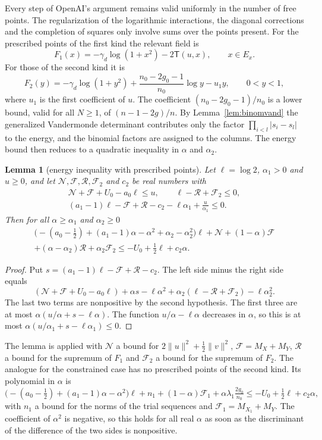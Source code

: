 \documentclass[11pt]{amsart}
\newtheorem{lemma}[theorem]{Lemma}
\theoremstyle{definition}
\theoremstyle{remark}
\numberwithin{equation}{section}
\begin{document}
Every step of OpenAI's argument remains valid uniformly in the number of free points. The regularization of
the logarithmic interactions, the diagonal corrections and the completion of squares only involve sums over
the points present. For the prescribed points of the first kind the relevant field is
\[
 F_1(x)=-\gamma_d\log(1+x^2)-2\mathsf T(u,x),\qquad x\in E_x .
\]
For those of the second kind it is
\[
 F_2(y)=-\gamma_d\log(1+y^2)+\frac{n_0-2g_0-1}{n_0}\log y-u_1y,\qquad0<y<1,
\]
where $u_1$ is the first coefficient of $u$. The coefficient $(n_0-2g_0-1)/n_0$ is a lower bound, valid for all
$N\ge1$, of $(n-1-2g)/n$. By Lemma~\ref{lem:binomvand} the generalized Vandermonde determinant contributes only
the factor $\prod_{i<l}|s_i-s_l|$ to the energy, and the binomial factors are assigned to the columns. The
energy bound then reduces to a quadratic inequality in $\alpha$ and $\alpha_2$.

\begin{lemma}[energy inequality with prescribed points]\label{lem:energy-ineq}
Let $\ell=\log2$, $\alpha_1>0$ and $u\ge0$, and let $\mathcal N,\mathcal F,\mathcal R,\mathcal F_2$ and $c_2$ be real
numbers with
\begin{gather*}
 \mathcal N+\mathcal F+U_0-a_0\ell\le u,\qquad \ell-\mathcal R+\mathcal F_2\le0,\\
 (a_1-1)\ell-\mathcal F+\mathcal R-c_2-\ell\alpha_1+\frac u{\alpha_1}\le0 .
\end{gather*}
Then for all $\alpha\ge\alpha_1$ and $\alpha_2\ge0$
\begin{multline*}
 \bigl(-(a_0-\tfrac12)+(a_1-1)\alpha-\alpha^2+\alpha_2-\alpha_2^2\bigr)\ell+\mathcal N+(1-\alpha)\mathcal F\\
 +(\alpha-\alpha_2)\mathcal R+\alpha_2\mathcal F_2\le-U_0+\tfrac12\ell+c_2\alpha .
\end{multline*}
\end{lemma}

\begin{proof}
Put $s=(a_1-1)\ell-\mathcal F+\mathcal R-c_2$. The left side minus the right side equals
\[
 (\mathcal N+\mathcal F+U_0-a_0\ell)+\alpha s-\ell\alpha^2+\alpha_2(\ell-\mathcal R+\mathcal F_2)-\ell\alpha_2^2 .
\]
The last two terms are nonpositive by the second hypothesis. The first three are at most
$\alpha(u/\alpha+s-\ell\alpha)$. The function $u/\alpha-\ell\alpha$ decreases in $\alpha$, so this is at most
$\alpha(u/\alpha_1+s-\ell\alpha_1)\le0$.
\end{proof}

The lemma is applied with $\mathcal N$ a bound for $2\|u\|^2+\frac12\|v\|^2$, $\mathcal F=M_X+M_Y$,
$\mathcal R$ a bound for the supremum of $F_1$ and $\mathcal F_2$ a bound for the supremum of $F_2$. The
analogue for the constrained case has no prescribed points of the second kind. Its polynomial in $\alpha$ is
\[
 \bigl(-(a_0-\tfrac12)+(a_1-1)\alpha-\alpha^2\bigr)\ell+n_1+(1-\alpha)\mathcal F_1+\alpha\lambda_1\tfrac{2g_0}{n_0}
 \le-U_0+\tfrac12\ell+c_2\alpha,
\]
with $n_1$ a bound for the norms of the trial sequences and $\mathcal F_1=M_{X_1}+M_Y$. The coefficient of $\alpha^2$ is negative, so this holds for all real $\alpha$ as soon as the discriminant of the
difference of the two sides is nonpositive.
\end{document}
